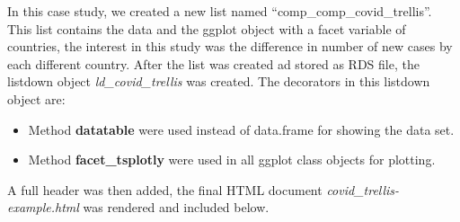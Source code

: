 \documentclass[
]{article}
\providecommand{\tightlist}{%
  \setlength{\itemsep}{0pt}\setlength{\parskip}{0pt}}
\begin{document}
In this case study, we created a new list named
``comp\_comp\_covid\_trellis''. This list contains the data and the
ggplot object with a facet variable of countries, the interest in this
study was the difference in number of new cases by each different
country. After the list was created ad stored as RDS file, the listdown
object \emph{ld\_covid\_trellis} was created. The decorators in this
listdown object are:

\begin{itemize}
\tightlist
\item
  Method \textbf{datatable} were used instead of data.frame for showing
  the data set.
\item
  Method \textbf{facet\_tsplotly} were used in all ggplot class objects
  for plotting.
\end{itemize}

A full header was then added, the final HTML document
\emph{covid\_trellis-example.html} was rendered and included below.
\end{document}
